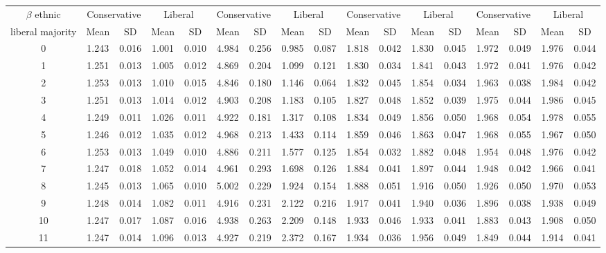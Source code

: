 \documentclass{article}
\begin{document}
\begin{table}[H]
{\begin{tabular}{|c|c|c|c|c|c|c|c|c|c|c|c|c|c|c|c|c|}
 $\beta$ ethnic & \multicolumn{2}{|c|}{Conservative} & \multicolumn{2}{|c|}{Liberal} 
& \multicolumn{2}{|c|}{Conservative} & \multicolumn{2}{|c|}{Liberal} & \multicolumn{2}{|c|}{Conservative} & \multicolumn{2}{|c|}{Liberal} 
& \multicolumn{2}{|c|}{Conservative} & \multicolumn{2}{|c|}{Liberal}\\
 liberal majority & Mean & SD & Mean & SD & Mean & SD & Mean & SD & Mean & SD & Mean & SD & Mean & SD & Mean & SD\\
 \hline
   0 & 1.243 & 0.016 & 1.001 & 0.010 & 4.984 & 0.256 & 0.985 & 0.087 & 1.818 & 0.042 & 1.830 & 0.045 & 1.972 & 0.049 & 1.976 & 0.044 \\ 
     1 & 1.251 & 0.013 & 1.005 & 0.012 & 4.869 & 0.204 & 1.099 & 0.121 & 1.830 & 0.034 & 1.841 & 0.043 & 1.972 & 0.041 & 1.976 & 0.042 \\ 
     2 & 1.253 & 0.013 & 1.010 & 0.015 & 4.846 & 0.180 & 1.146 & 0.064 & 1.832 & 0.045 & 1.854 & 0.034 & 1.963 & 0.038 & 1.984 & 0.042 \\ 
     3 & 1.251 & 0.013 & 1.014 & 0.012 & 4.903 & 0.208 & 1.183 & 0.105 & 1.827 & 0.048 & 1.852 & 0.039 & 1.975 & 0.044 & 1.986 & 0.045 \\ 
     4 & 1.249 & 0.011 & 1.026 & 0.011 & 4.922 & 0.181 & 1.317 & 0.108 & 1.834 & 0.049 & 1.856 & 0.050 & 1.968 & 0.054 & 1.978 & 0.055 \\ 
     5 & 1.246 & 0.012 & 1.035 & 0.012 & 4.968 & 0.213 & 1.433 & 0.114 & 1.859 & 0.046 & 1.863 & 0.047 & 1.968 & 0.055 & 1.967 & 0.050 \\ 
     6 & 1.253 & 0.013 & 1.049 & 0.010 & 4.886 & 0.211 & 1.577 & 0.125 & 1.854 & 0.032 & 1.882 & 0.048 & 1.954 & 0.048 & 1.976 & 0.042 \\ 
     7 & 1.247 & 0.018 & 1.052 & 0.014 & 4.961 & 0.293 & 1.698 & 0.126 & 1.884 & 0.041 & 1.897 & 0.044 & 1.948 & 0.042 & 1.966 & 0.041 \\ 
     8 & 1.245 & 0.013 & 1.065 & 0.010 & 5.002 & 0.229 & 1.924 & 0.154 & 1.888 & 0.051 & 1.916 & 0.050 & 1.926 & 0.050 & 1.970 & 0.053 \\ 
     9 & 1.248 & 0.014 & 1.082 & 0.011 & 4.916 & 0.231 & 2.122 & 0.216 & 1.917 & 0.041 & 1.940 & 0.036 & 1.896 & 0.038 & 1.938 & 0.049 \\ 
    10 & 1.247 & 0.017 & 1.087 & 0.016 & 4.938 & 0.263 & 2.209 & 0.148 & 1.933 & 0.046 & 1.933 & 0.041 & 1.883 & 0.043 & 1.908 & 0.050 \\ 
    11 & 1.247 & 0.014 & 1.096 & 0.013 & 4.927 & 0.219 & 2.372 & 0.167 & 1.934 & 0.036 & 1.956 & 0.049 & 1.849 & 0.044 & 1.914 & 0.041 \\ 

\end{tabular}}
\end{table}
\end{document}
